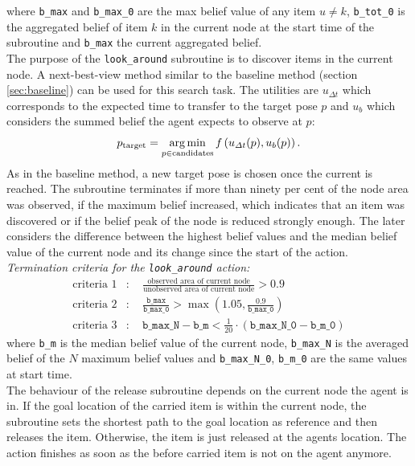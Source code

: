 where \texttt{b\_max} and \texttt{b\_max\_0} are the max belief value of any item $u\neq k$, \texttt{b\_tot\_0} is the aggregated belief of item $k$ in the current node at the start time of the subroutine and \texttt{b\_max} the current aggregated belief.\\

The purpose of the \texttt{look\_around} subroutine is to discover items in the current node. A next-best-view method similar to the baseline method (section \ref{sec:baseline}) can be used for this search task. The utilities are $u_{\Delta t}$ which corresponds to the expected time to transfer to the target pose $p$ and $u_b$  which considers the summed belief the agent expects to observe at $p$:
\begin{equation}
p_\text{target} = \operatorname*{arg\,min}_{p\in \text{candidates}} f\left(u_{\Delta t}(p), u_b(p)\right).
\end{equation}
As in the baseline method, a new target pose is chosen once the current is reached. The subroutine terminates if more than ninety per cent of the node area was observed, if the maximum belief increased, which indicates that an item was discovered or if the belief peak of the node is reduced strongly enough. The later considers the difference between the highest belief values and the median belief value of the current node and its change since the start of the action. \\

\textit{Termination criteria for the \texttt{look\_around} action:}
\begin{align}
    \text{criteria 1}&: \quad \frac{\text{observed area of current node}}{\text{unobserved area of current node}} > 0.9\\
    \text{criteria 2}&: \quad \frac{\texttt{b\_max}}{\texttt{b\_max\_0}} > \max\left(1.05, \frac{0.9}{\texttt{b\_max\_0}}\right)\\
    \text{criteria 3}&: \quad  \texttt{b\_max\_N} - \texttt{b\_m} < \frac{1}{20}\cdot (\texttt{b\_max\_N\_0} - \texttt{b\_m\_0})
\end{align}
where \texttt{b\_m} is the median belief value of the current node, \texttt{b\_max\_N} is the averaged belief of the $N$ maximum belief values and \texttt{b\_max\_N\_0}, \texttt{b\_m\_0} are the same values at start time.\\

The behaviour of the release subroutine depends on the current node the agent is in. If the goal location of the carried item is within the current node, the subroutine sets the shortest path to the goal location as reference and then releases the item. Otherwise, the item is just released at the agents location. The action finishes as soon as the before carried item is not on the agent anymore.
